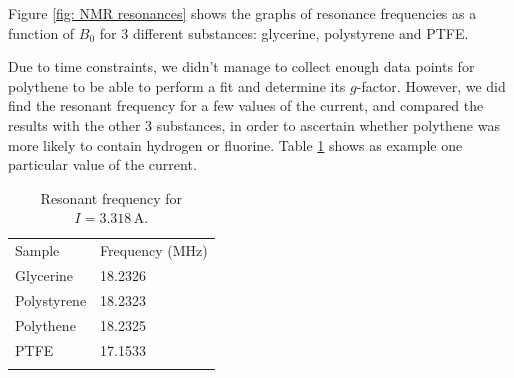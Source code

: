 \documentclass[a4paper]{jpconf}
\numberwithin{equation}{section}
\begin{document}
Figure \ref{fig: NMR resonances} shows the graphs of resonance frequencies as a function of $B_0$ for 3 different substances: glycerine, polystyrene and PTFE.

Due to time constraints, we didn't manage to collect enough data points for polythene to be able to perform a fit and determine its $g$-factor. However, we did find the resonant frequency for a few values of the current, and compared the results with the other 3 substances, in order to ascertain whether polythene was more likely to contain hydrogen or fluorine. Table \ref{table: polythene} shows as example one particular value of the current.

\begin{table}
	\caption{\label{table: polythene} Resonant frequency for $I = 3.318 \, \si{\ampere}$.}
	\begin{center}
		\begin{tabular}{ll}
			\br
			Sample&Frequency ($\si{\mega\hertz}$)\\
			\mr
			Glycerine&18.2326\\
			Polystyrene&18.2323\\
			Polythene&18.2325\\
			PTFE&17.1533\\
			\br
		\end{tabular}
	\end{center}
\end{table}
\end{document}
